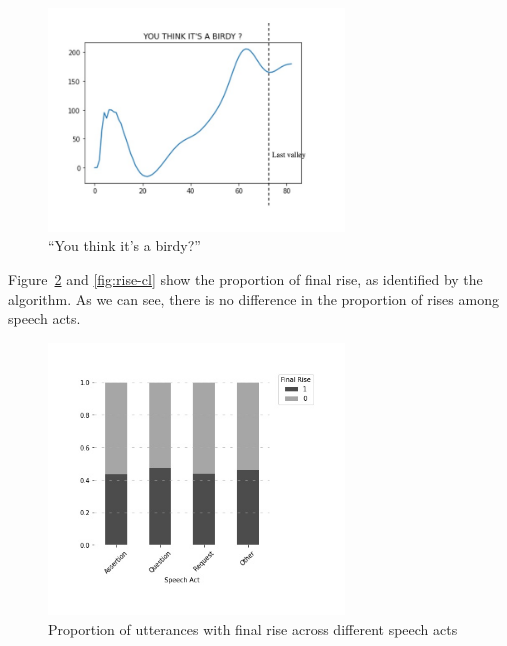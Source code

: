 \begin{figure}[H]
    \centering
    \includegraphics[width=0.7\textwidth]{figures/pitch-rise.jpg}
    \caption{``You think it's a birdy?''}
    \label{fig:rise-example}
\end{figure}

Figure~\ref{fig:rise-sp} and \ref{fig:rise-cl} show the proportion of final rise, as identified by the algorithm. As we can see, there is no difference in the proportion of rises among speech acts. 

\begin{figure}[H]
    \centering
    \includegraphics[width=0.7\textwidth]{figures/rise-sp.jpg}
    \caption{Proportion of utterances with final rise across different speech acts}
    \label{fig:rise-sp}
\end{figure}


